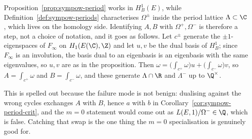 \begin{remark}
  \label{rem:period-normalisation}
  Proposition~\ref{prop:sympow-period} works in $H^{1}_{B}(E)$, while
  Definition~\ref{def:sympow-periods} characterises $\Omega^{\pm}$ inside the period lattice
  $\Lambda \subset \C$, which lives on the homology side. Identifying $A,B$ with
  $\Omega^{+},\Omega^{-}$ is therefore a step, not a choice of notation, and it goes as
  follows. Let $c^{\pm}$ generate the $\pm1$-eigenspaces of $F_{\infty}$ on
  $H_{1}(E(\C),\Z)$ and let $u,v$ be the dual basis of $H^{1}_{B}$; since $F_{\infty}$ is an
  involution, the basis dual to an eigenbasis is an eigenbasis with the same eigenvalues, so
  $u,v$ are as in the proposition. Then
  $\omega = \bigl(\int_{c^{+}}\omega\bigr)u + \bigl(\int_{c^{-}}\omega\bigr)v$, so
  $A = \int_{c^{+}}\omega$ and $B = \int_{c^{-}}\omega$, and these generate $\Lambda \cap \R$
  and $\Lambda^{-}$ up to $\Q^{\times}$.

  This is spelled out because the failure mode is not benign: dualising against the wrong
  cycles exchanges $A$ with $B$, hence $a$ with $b$ in
  Corollary~\ref{cor:sympow-period-crit}, and the $m=0$ statement would come out as
  $L(E,1)/\Omega^{-} \in \Q$, which is false. Catching that swap is the one thing the $m=0$
  specialisation is genuinely good for.
\end{remark}

